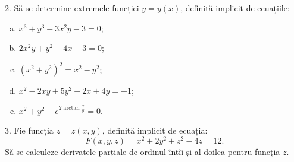 \vspace{1cm}

2. Să se determine extremele funcției $ y = y(x) $, definită implicit
de ecuațiile:
\begin{enumerate}[(a)]
\item $ x^3 + y^3 - 3x^2y - 3 = 0 $;
\item $ 2x^2y + y^2 - 4x - 3 = 0 $;
\item $ (x^2 + y^2)^2 = x^2 - y^2 $;
\item $ x^2 - 2xy + 5y^2 - 2x + 4y = - 1 $;
\item $ x^2 + y^2 - e^{2 \arctan \frac{x}{y}} = 0 $.
\end{enumerate}

\vspace{1cm}

3. Fie funcția $ z = z(x, y) $, definită implicit de ecuația:
\[
  F(x, y, z) = x^2 + 2y^2 + z^2 - 4z = 12.
\]
Să se calculeze derivatele parțiale de ordinul întîi și al doilea
pentru funcția $ z $.

